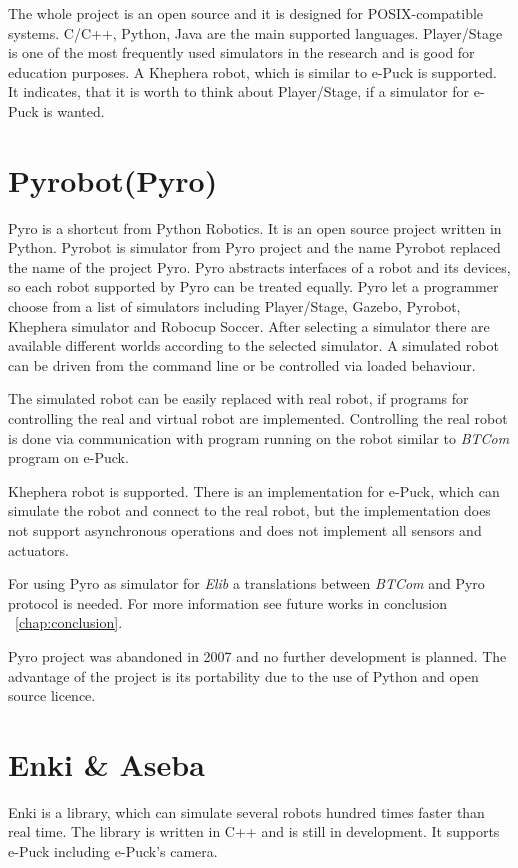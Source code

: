 	The whole project is an open source and it is designed for POSIX-compatible systems.
	C/C++, Python, Java are the main supported languages.
	Player/Stage is one of the most frequently used simulators in the research and is good for education purposes.
	A Khephera robot, which is similar to e-Puck is supported.
	It indicates, that it is worth to think about Player/Stage, if a simulator for e-Puck is wanted.
\section{Pyrobot(Pyro)\cite{pyro}}
	
	Pyro is a shortcut from Python Robotics. It is an open source project written in Python. Pyrobot is simulator
	from Pyro project and the name Pyrobot replaced the name of the project Pyro. 
	Pyro abstracts interfaces of a robot and
	its devices, so each robot supported by Pyro can be treated equally.
	Pyro let a programmer choose from a list of simulators including Player/Stage, Gazebo, Pyrobot, Khephera simulator
	and Robocup Soccer.
	After selecting a simulator there are available different worlds according to the selected simulator.
	A simulated robot can be driven from the command line or be controlled via loaded behaviour.
	
	The simulated robot can be easily replaced with real robot, if programs for controlling the real 
	and virtual robot are implemented. 	
	Controlling the real robot is done via communication with program running on the robot similar 
	to {\it BTCom} program on e-Puck.
	
	Khephera robot is supported. There is an implementation for e-Puck, which can simulate the robot
	and connect to the real robot, but the implementation does not support asynchronous operations and does 
	not implement all sensors and actuators.
	
	For using Pyro as simulator for {\it Elib} a translations between {\it BTCom} and Pyro protocol is needed.
	For more information see future works in conclusion ~\ref{chap:conclusion}.	
	
	Pyro project was abandoned in 2007 and no further development is planned.
	The advantage of the project is its portability due to the use of Python and open source licence.
\section{Enki \& Aseba\cite{enki}}
	Enki is a library, which can simulate several robots hundred times faster than real time.
	The library is written in C++ and is still in development. It supports e-Puck including e-Puck's camera. 
	
